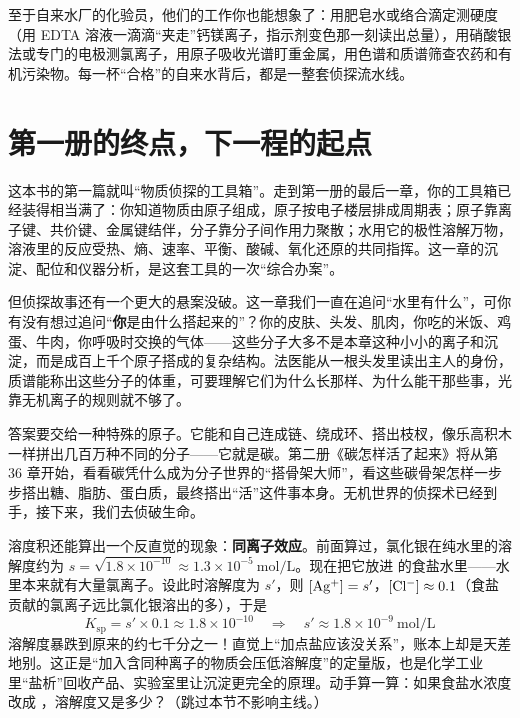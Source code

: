 至于自来水厂的化验员，他们的工作你也能想象了：用肥皂水或络合滴定测硬度（用 EDTA 溶液一滴滴“夹走”钙镁离子，指示剂变色那一刻读出总量），用硝酸银法或专门的电极测氯离子，用原子吸收光谱盯重金属，用色谱和质谱筛查农药和有机污染物。每一杯“合格”的自来水背后，都是一整套侦探流水线。

\section{第一册的终点，下一程的起点}

这本书的第一篇就叫“物质侦探的工具箱”。走到第一册的最后一章，你的工具箱已经装得相当满了：你知道物质由原子组成，原子按电子楼层排成周期表；原子靠离子键、共价键、金属键结伴，分子靠分子间作用力聚散；水用它的极性溶解万物，溶液里的反应受热、熵、速率、平衡、酸碱、氧化还原的共同指挥。这一章的沉淀、配位和仪器分析，是这套工具的一次“综合办案”。

但侦探故事还有一个更大的悬案没破。这一章我们一直在追问“水里有什么”，可你有没有想过追问“\textbf{你}是由什么搭起来的”？你的皮肤、头发、肌肉，你吃的米饭、鸡蛋、牛肉，你呼吸时交换的气体——这些分子大多不是本章这种小小的离子和沉淀，而是成百上千个原子搭成的复杂结构。法医能从一根头发里读出主人的身份，质谱能称出这些分子的体重，可要理解它们为什么长那样、为什么能干那些事，光靠无机离子的规则就不够了。

答案要交给一种特殊的原子。它能和自己连成链、绕成环、搭出枝杈，像乐高积木一样拼出几百万种不同的分子——它就是碳。第二册《碳怎样活了起来》将从第 36 章开始，看看碳凭什么成为分子世界的“搭骨架大师”，看这些碳骨架怎样一步步搭出糖、脂肪、蛋白质，最终搭出“活”这件事本身。无机世界的侦探术已经到手，接下来，我们去侦破生命。

\begin{tiaozhan}
溶度积还能算出一个反直觉的现象：\textbf{同离子效应}。前面算过，氯化银在纯水里的溶解度约为 $s=\sqrt{1.8\times10^{-10}}\approx1.3\times10^{-5}\ \mathrm{mol/L}$。现在把它放进  的食盐水里——水里本来就有大量氯离子。设此时溶解度为 $s'$，则 $[\mathrm{Ag^+}]=s'$，$[\mathrm{Cl^-}]\approx0.1$（食盐贡献的氯离子远比氯化银溶出的多），于是
\[K_{\mathrm{sp}} = s'\times0.1 \approx 1.8\times10^{-10} \quad\Rightarrow\quad s'\approx1.8\times10^{-9}\ \mathrm{mol/L}\]
溶解度暴跌到原来的约七千分之一！直觉上“加点盐应该没关系”，账本上却是天差地别。这正是“加入含同种离子的物质会压低溶解度”的定量版，也是化学工业里“盐析”回收产品、实验室里让沉淀更完全的原理。动手算一算：如果食盐水浓度改成 ，溶解度又是多少？（跳过本节不影响主线。）
\end{tiaozhan}

